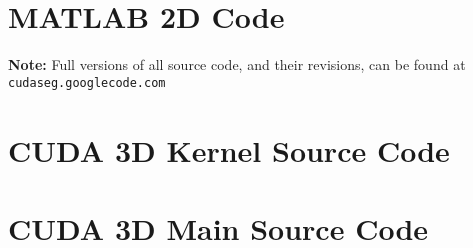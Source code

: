 \appendix


\chapter{MATLAB 2D Code}


\begin{center}
\textbf{Note:} Full versions of all source code, and their revisions, can be found at\\
\texttt{cudaseg.googlecode.com}
\\[2em]
\end{center}

\lstset{language=matlab,basicstyle=\footnotesize}


\chapter{CUDA 3D Kernel Source Code}
\lstset{language=c,basicstyle=\footnotesize}


\newpage
\chapter{CUDA 3D Main Source Code}
\lstset{language=c,basicstyle=\footnotesize}






